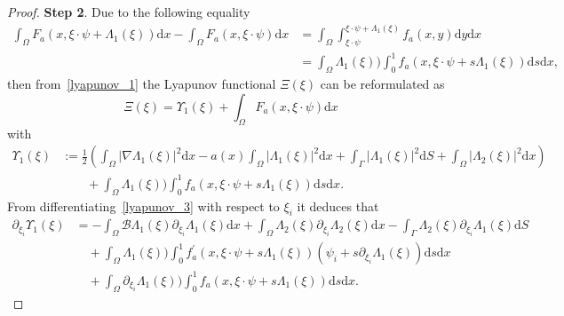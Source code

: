 \documentclass[10pt,a4paper]{amsart}
\begin{document}
\begin{proof}
\textbf{Step 2}. Due to the following equality
\begin{equation*}
\begin{split}
 \int_{\Omega}F_a(x, \xi\cdot\psi + \Lambda_1(\xi))\mathrm{d}x -\int_{\Omega}F_a(x, \xi\cdot\psi)\mathrm{d}x &=  \int_{\Omega}\int_{\xi\cdot\psi}^{\xi\cdot\psi + \Lambda_1(\xi)}f_a(x, y)\mathrm{d}y\mathrm{d}x\\
 &=\int_{\Omega}\Lambda_1(\xi))\int^{1}_{0}f_a(x, \xi\cdot\psi + s\Lambda_1(\xi))\mathrm{d}s\mathrm{d}x,	
\end{split}
\end{equation*}
then from~\eqref{lyapunov_1} the Lyapunov functional $\Xi(\xi)$ can be reformulated as
\begin{equation*}
\Xi(\xi) =  \Upsilon_1(\xi) +  \int_{\Omega}F_a(x, \xi\cdot\psi)\mathrm{d}x
\end{equation*}
with
\begin{equation}\label{lyapunov_3}
\begin{split}
\Upsilon_1(\xi) &:= \frac{1}{2}\left(\int_{\Omega}|\nabla  \Lambda_1(\xi)|^2\mathrm{d}x - a(x)\int_{\Omega}|  \Lambda_1(\xi)|^2\mathrm{d}x + \int_{\Gamma}|\Lambda_1(\xi)|^2\mathrm{d}S + \int_{\Omega}|\Lambda_2(\xi)|^2\mathrm{d}x\right) \\
&\qquad + \int_{\Omega}\Lambda_1(\xi))\int^{1}_{0}f_a(x, \xi\cdot\psi + s\Lambda_1(\xi))\mathrm{d}s\mathrm{d}x. 
\end{split}
\end{equation}
From differentiating~\eqref{lyapunov_3} with respect to $\xi_i$ it deduces that
\begin{equation}\label{diff_lyapunov_3}
\begin{split}
\partial_{\xi_i}\Upsilon_1(\xi) &=  -\int_{\Omega}\mathcal{B}\Lambda_1(\xi)\partial_{\xi_i}\Lambda_1(\xi)\mathrm{d}x + \int_{\Omega}\Lambda_2(\xi)\partial_{\xi_i}\Lambda_2(\xi)\mathrm{d}x-\int_{\Gamma} \Lambda_2(\xi)\partial_{\xi_i}\Lambda_1(\xi)\mathrm{d}S\\
&\quad + \int_{\Omega}\Lambda_1(\xi))\int^{1}_{0} f^{\prime}_a(x, \xi\cdot\psi + s\Lambda_1(\xi))(\psi_i + s\partial_{\xi_i}\Lambda_1(\xi))\mathrm{d}s\mathrm{d}x\\
&\quad + \int_{\Omega}\partial_{\xi_i}\Lambda_1(\xi))\int^{1}_{0}f_a(x, \xi\cdot\psi + s\Lambda_1(\xi))\mathrm{d}s\mathrm{d}x.
\end{split}
\end{equation}


\end{proof}
\end{document}
